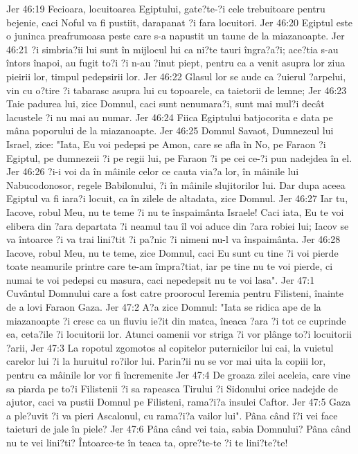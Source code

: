 Jer 46:19  Fecioara, locuitoarea Egiptului, gate?te-?i cele trebuitoare pentru bejenie, caci Noful va fi pustiit, darapanat ?i fara locuitori.
Jer 46:20  Egiptul este o juninca preafrumoasa peste care s-a napustit un taune de la miazanoapte.
Jer 46:21  ?i simbria?ii lui sunt în mijlocul lui ca ni?te tauri îngra?a?i; ace?tia s-au întors înapoi, au fugit to?i ?i n-au ?inut piept, pentru ca a venit asupra lor ziua pieirii lor, timpul pedepsirii lor.
Jer 46:22  Glasul lor se aude ca ?uierul ?arpelui, vin cu o?tire ?i tabarasc asupra lui cu topoarele, ca taietorii de lemne;
Jer 46:23  Taie padurea lui, zice Domnul, caci sunt nenumara?i, sunt mai mul?i decât lacustele ?i nu mai au numar.
Jer 46:24  Fiica Egiptului batjocorita e data pe mâna poporului de la miazanoapte.
Jer 46:25  Domnul Savaot, Dumnezeul lui Israel, zice: "Iata, Eu voi pedepsi pe Amon, care se afla în No, pe Faraon ?i Egiptul, pe dumnezeii ?i pe regii lui, pe Faraon ?i pe cei ce-?i pun nadejdea în el.
Jer 46:26  ?i-i voi da în mâinile celor ce cauta via?a lor, în mâinile lui Nabucodonosor, regele Babilonului, ?i în mâinile slujitorilor lui. Dar dupa aceea Egiptul va fi iara?i locuit, ca în zilele de altadata, zice Domnul.
Jer 46:27  Iar tu, Iacove, robul Meu, nu te teme ?i nu te înspaimânta Israele! Caci iata, Eu te voi elibera din ?ara departata ?i neamul tau îl voi aduce din ?ara robiei lui; Iacov se va întoarce ?i va trai lini?tit ?i pa?nic ?i nimeni nu-l va înspaimânta.
Jer 46:28  Iacove, robul Meu, nu te teme, zice Domnul, caci Eu sunt cu tine ?i voi pierde toate neamurile printre care te-am împra?tiat, iar pe tine nu te voi pierde, ci numai te voi pedepsi cu masura, caci nepedepsit nu te voi lasa".
Jer 47:1  Cuvântul Domnului care a fost catre proorocul Ieremia pentru Filisteni, înainte de a lovi Faraon Gaza.
Jer 47:2  A?a zice Domnul: "Iata se ridica ape de la miazanoapte ?i cresc ca un fluviu ie?it din matca, îneaca ?ara ?i tot ce cuprinde ea, ceta?ile ?i locuitorii lor. Atunci oamenii vor striga ?i vor plânge to?i locuitorii ?arii,
Jer 47:3  La ropotul zgomotos al copitelor puternicilor lui cai, la vuietul carelor lui ?i la huruitul ro?ilor lui. Parin?ii nu se vor mai uita la copiii lor, pentru ca mâinile lor vor fi încremenite
Jer 47:4  De groaza zilei aceleia, care vine sa piarda pe to?i Filistenii ?i sa rapeasca Tirului ?i Sidonului orice nadejde de ajutor, caci va pustii Domnul pe Filisteni, rama?i?a insulei Caftor.
Jer 47:5  Gaza a ple?uvit ?i va pieri Ascalonul, cu rama?i?a vailor lui". Pâna când î?i vei face taieturi de jale în piele?
Jer 47:6  Pâna când vei taia, sabia Domnului? Pâna când nu te vei lini?ti? Întoarce-te în teaca ta, opre?te-te ?i te lini?te?te!
